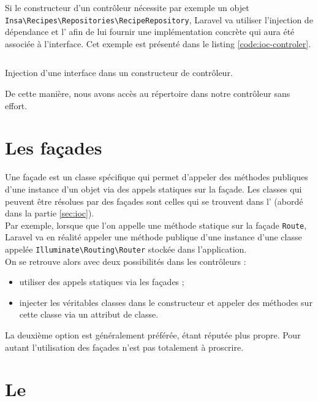 	Si le constructeur d'un contrôleur nécessite par exemple un objet \verb|Insa\Recipes\Repositories\RecipeRepository|, Laravel va utiliser l'injection de dépendance et l'\ioc{} afin de lui fournir une implémentation concrète qui aura été associée à l'interface. Cet exemple est présenté dans le listing \ref{code:ioc-controler}.
	\begin{listing}[H]
		\inputminted{php}{code/injectionClass.php}
		\caption{Injection d'une interface dans un constructeur de contrôleur.}
		\label{code:ioc-controler}
	\end{listing}

	De cette manière, nous avons accès au répertoire dans notre contrôleur sans effort.

\section{Les façades}
	Une façade est un classe spécifique qui permet d'appeler des méthodes publiques d'une instance d'un objet via des appels statiques sur la façade. Les classes qui peuvent être résolues par des façades sont celles qui se trouvent dans l'\ioc{} (abordé dans la partie \ref{sec:ioc}).\\

	Par exemple, lorsque que l'on appelle une méthode statique sur la façade \verb|Route|, Laravel va en réalité appeler une méthode publique d'une instance d'une classe appelée \verb|Illuminate\Routing\Router| stockée dans l'application.\\

	On se retrouve alors avec deux possibilités dans les contrôleurs :
	\begin{itemize}
		\item utiliser des appels statiques via les façades ;
		\item injecter les véritables classes dans le constructeur et appeler des méthodes sur cette classe via un attribut de classe.
	\end{itemize}
	\vspace{10px}
	La deuxième option est généralement préférée, étant réputée plus propre. Pour autant l'utilisation des façades n'est pas totalement à proscrire.

\section{Le \repositoryPattern}

